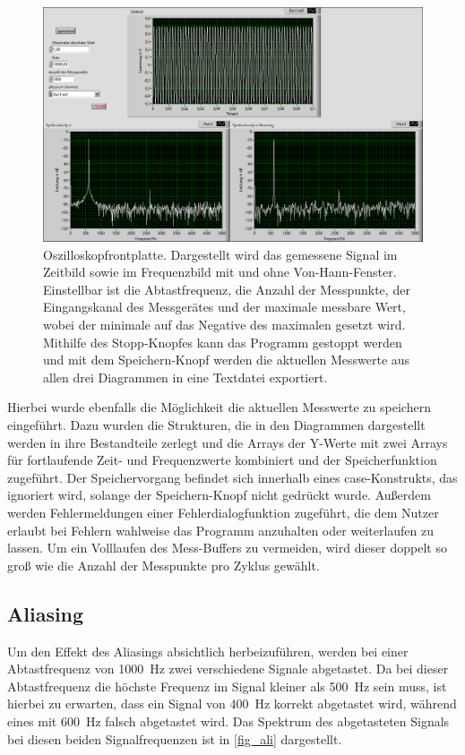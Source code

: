 \documentclass[
a4paper,
12pt,
pagesize,
ngerman
]{scrartcl}
\begin{document}
	\begin{figure}[H]  
		\includegraphics[width=1\textwidth]{EIRE2018Dateien/Tag3/ManuellVIp}
		\centering
		\caption{
			Oszilloskopfrontplatte. Dargestellt wird das gemessene Signal im Zeitbild sowie im Frequenzbild mit und ohne Von-Hann-Fenster. Einstellbar ist die Abtastfrequenz, die Anzahl der Messpunkte, der Eingangskanal des Messgerätes und der maximale messbare Wert, wobei der minimale auf das Negative des maximalen gesetzt wird.
			Mithilfe des Stopp-Knopfes kann das Programm gestoppt werden und mit dem Speichern-Knopf werden die aktuellen Messwerte aus allen drei Diagrammen in eine Textdatei exportiert.
		}
		\label{fig_tag23_oszi_manuell_front}
		\centering
	\end{figure}

	Hierbei wurde ebenfalls die Möglichkeit die aktuellen Messwerte zu speichern eingeführt.
	Dazu wurden die Strukturen, die in den Diagrammen dargestellt werden in ihre Bestandteile zerlegt und die Arrays der Y-Werte mit zwei Arrays für fortlaufende Zeit- und Frequenzwerte kombiniert und der Speicherfunktion zugeführt.
	Der Speichervorgang befindet sich innerhalb eines case-Konstrukts, das ignoriert wird, solange der Speichern-Knopf nicht gedrückt wurde.
	Außerdem werden Fehlermeldungen einer Fehlerdialogfunktion zugeführt, die dem Nutzer erlaubt bei Fehlern wahlweise das Programm anzuhalten oder weiterlaufen zu lassen.
	Um ein Volllaufen des Mess-Buffers zu vermeiden, wird dieser doppelt so groß wie die Anzahl der Messpunkte pro Zyklus gewählt.
	
	\subsection{Aliasing}
	Um den Effekt des Aliasings absichtlich herbeizuführen, werden bei einer Abtastfrequenz von \SI{1000}{\hertz} zwei verschiedene Signale abgetastet.
	Da bei dieser Abtastfrequenz die höchste Frequenz im Signal kleiner als \SI{500}{\hertz} sein muss, ist hierbei zu erwarten, dass ein Signal von \SI{400}{\hertz} korrekt abgetastet wird, während eines mit \SI{600}{\hertz} falsch abgetastet wird.
	Das Spektrum des abgetasteten Signals bei diesen beiden Signalfrequenzen ist in \cref{fig_ali} dargestellt.
	
\end{document}
